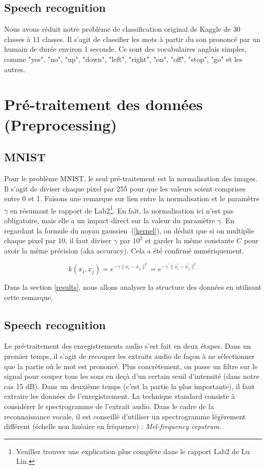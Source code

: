 \documentclass[12 pt, a4paper]{article}
\begin{document}
\subsection{Speech recognition}
Nous avons réduit notre problème de classification original de Kaggle de 30 classes à 11 classes. Il s'agit de classifier les mots à partir du son prononcé par un humain de durée environ 1 seconde. Ce sont des vocabulaires anglais simples, comme "yes", "no", "up", "down", "left", "right", "on", "off", "stop", "go" et les autres.



\section{Pré-traitement des données (Preprocessing)}
\subsection{MNIST}
Pour le problème MNIST, le seul pré-traitement est la normalisation des images. Il s'agit de diviser chaque pixel par 255 pour que les valeurs soient comprises entre 0 et 1. Faisons une remarque sur lien entre la normalisation et le paramètre $\gamma$ en résumant le rapport de Lab2\footnote{Veuillez trouver une explication plus complète dans le rapport Lab2 de Lu Lin.}. En fait, la normalisation ici n'est pas obligatoire, mais elle a un impact direct sur la valeur du paramètre $\gamma$. En regardant la formule du noyau gaussien~(\ref{kernel}), on déduit que si on multiplie chaque pixel par $10$, il faut diviser $\gamma$ par $10^{2}$ et garder la même constante $C$ pour avoir la même précision (aka accuracy). Cela a été confirmé numériquement. 

\begin{equation}\label{kernel}
k(x_{i}, x_{j}) = e^{-\gamma \| x_{i}- x_{j} \|^{2}} = e^{-\gamma^{\prime} \| x_{i}^{\prime}-x_{j}^{\prime}\|^{2}}
\end{equation}

Dans la section \ref{results}, nous allons analyser la structure des données en utilisant cette remarque.

\subsection{Speech recognition}

Le pré-traitement des enregistrements audio s'est fait en deux étapes. Dans un premier temps, il s'agit de recouper les extraits audio de façon à ne sélectionner que la partie où le mot est prononcé. Plus concrètement, on passe un filtre sur le signal pour couper tous les sons en deçà d'un certain seuil d'intensité (dans notre cas 15 dB). Dans un deuxième temps (c'est la partie la plus importante), il faut extraire les données de l'enregistrement. La technique standard consiste à considérer le spectrogramme de l'extrait audio. Dans le cadre de la reconnaissance vocale, il est conseillé d'utiliser un spectrogramme légèrement différent (échelle non linéaire en fréquence) : \textit{Mel-frequency cepstrum}.
\end{document}
